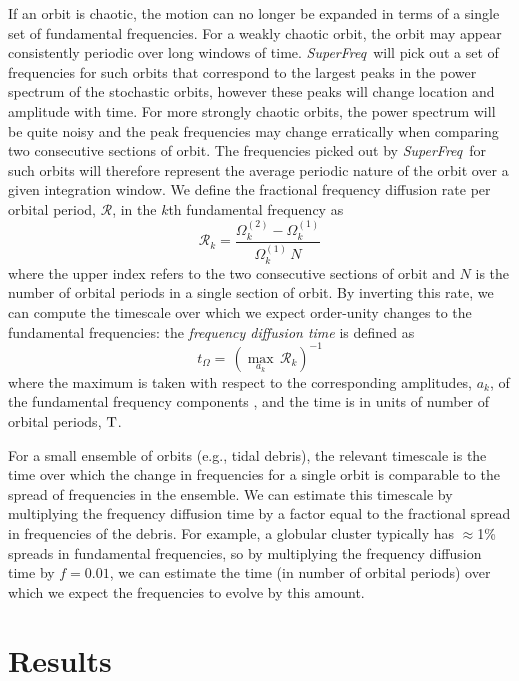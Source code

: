 \documentclass[letterpaper,12pt,preprint]{aastex}
\newcommand{\project}[1]{\textsl{#1}}
\newcommand{\superfreq}{\project{SuperFreq}}
\begin{document}
If an orbit is chaotic, the motion can no longer be expanded in terms of a single set of fundamental frequencies. For a weakly chaotic orbit, the orbit may appear consistently periodic over long windows of time. \superfreq\ will pick out a set of frequencies for such orbits that correspond to the largest peaks in the power spectrum of the stochastic orbits, however these peaks will change location and amplitude with time. For more strongly chaotic orbits, the power spectrum will be quite noisy and the peak frequencies may change erratically when comparing two consecutive sections of orbit. The frequencies picked out by \superfreq\ for such orbits will therefore represent the average periodic nature of the orbit over a given integration window. We define the fractional frequency diffusion rate per orbital period, $\mathcal{R}$, in the $k$th fundamental frequency as
\begin{equation}
	\mathcal{R}_k = \frac{\Omega_{k}^{(2)} - \Omega_{k}^{(1)}}{\Omega_{k}^{(1)} \, N} \label{eq:fdrate}
\end{equation}
where the upper index refers to the two consecutive sections of orbit and $N$ is the number of orbital periods in a single section of orbit. By inverting this rate, we can compute the timescale over which we expect order-unity changes to the fundamental frequencies: the \emph{frequency diffusion time} is defined as
\begin{equation}
	t_\Omega = \, (\max_{a_k} \, \mathcal{R}_k)^{-1} \label{eq:fdtime}
\end{equation}
where the maximum is taken with respect to the corresponding amplitudes, $a_k$, of the fundamental frequency components \citep[see][]{valluri12}, and the time is in units of number of orbital periods, ${\rm T}$. 

For a small ensemble of orbits (e.g., tidal debris), the relevant timescale is the time over which the change in frequencies for a single orbit is comparable to the spread of frequencies in the ensemble. We can estimate this timescale by multiplying the frequency diffusion time by a factor equal to the fractional spread in frequencies of the debris. For example, a globular cluster typically has $\approx$1\% spreads in fundamental frequencies, so by multiplying the frequency diffusion time by $f = 0.01$, we can estimate the time (in number of orbital periods) over which we expect the frequencies to evolve by this amount.

%
\section{Results}
\end{document}
